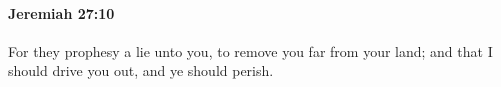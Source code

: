 
		\paragraph{Jeremiah 27:10} %
			\label{JEREMIAH-27-10}

			For they prophesy a lie unto you, to remove you far from your land; and that I should drive you out, and ye should perish.


